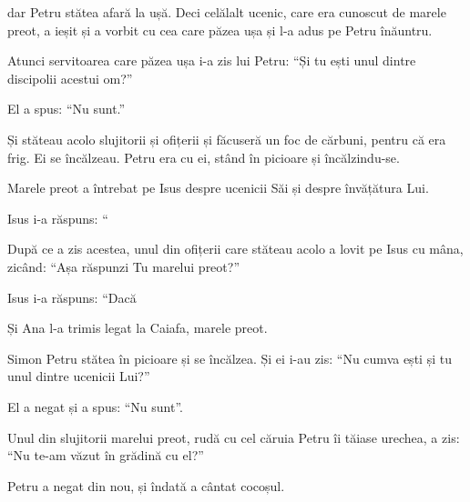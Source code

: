 {dar Petru stătea afară la ușă. Deci celălalt ucenic, care era cunoscut de marele preot, a ieșit și a vorbit cu cea care păzea ușa și l-a adus pe Petru înăuntru.

Atunci servitoarea care păzea ușa i-a zis lui Petru: “Și tu ești unul dintre discipolii acestui om?”

\par }{\PP El a spus: “Nu sunt.”


\par }{\PP {}Și stăteau acolo slujitorii și ofițerii și făcuseră un foc de cărbuni, pentru că era frig. Ei se încălzeau. Petru era cu ei, stând în picioare și încălzindu-se.


\par }{\PP {}Marele preot a întrebat pe Isus despre ucenicii Săi și despre învățătura Lui.


\par }{\PP {}Isus i-a răspuns: “{}



\par }{\PP {}După ce a zis acestea, unul din ofițerii care stăteau acolo a lovit pe Isus cu mâna, zicând: “Așa răspunzi Tu marelui preot?”


\par }{\PP {}Isus i-a răspuns: “Dacă
{}


\par }{\PP {}Și Ana l-a trimis legat la Caiafa, marele preot.


\par }{\PP {}Simon Petru stătea în picioare și se încălzea. Și ei i-au zis: “Nu cumva ești și tu unul dintre ucenicii Lui?”

\par }{\PP El a negat și a spus: “Nu sunt”.


\par }{\PP {}Unul din slujitorii marelui preot, rudă cu cel căruia Petru îi tăiase urechea, a zis: “Nu te-am văzut în grădină cu el?”


\par }{\PP {}Petru a negat din nou, și îndată a cântat cocoșul.


}
